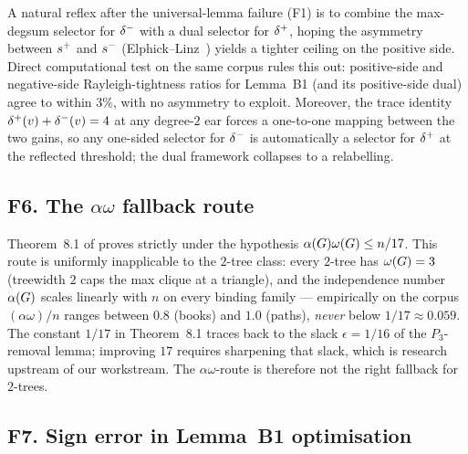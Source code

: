 A natural reflex after the universal-lemma failure (F1) is to combine
the max-degsum selector for $\delta^{-}$ with a dual selector for $\delta^{+}$,
hoping the asymmetry between $s^{+}$ and $s^{-}$
(Elphick--Linz~\cite{ElphickLinz2023}) yields a tighter ceiling on the
positive side. Direct computational test on the same corpus rules this
out: positive-side and negative-side Rayleigh-tightness ratios for
Lemma~B1 (and its positive-side dual) agree to within $3\%$, with no
asymmetry to exploit. Moreover, the trace identity
$\delta^{+}(v) + \delta^{-}(v) = 4$ at any degree-$2$ ear forces a one-to-one
mapping between the two gains, so any one-sided selector for $\delta^{-}$
is automatically a selector for $\delta^{+}$ at the reflected threshold;
the dual framework collapses to a relabelling.

\subsection{F6. The $\alpha\omega$ fallback route}\label{sec:fm:alpha-omega}

Theorem~8.1 of \cite{AKMPZ2025} proves  strictly under
the hypothesis $\alpha(G) \omega(G) \le n/17$. This route is
uniformly inapplicable to the $2$-tree class: every $2$-tree has
$\omega(G) = 3$ (treewidth $2$ caps the max clique at a triangle),
and the independence number $\alpha(G)$ scales linearly with $n$
on every binding family — empirically on the corpus
$(\alpha \omega)/n$ ranges between $0.8$ (books) and $1.0$ (paths),
\emph{never} below $1/17 \approx 0.059$. The constant $1/17$ in
Theorem~8.1 traces back to the slack $\epsilon = 1/16$ of the
$P_{3}$-removal lemma; improving $17$ requires sharpening that slack,
which is research upstream of our workstream. The $\alpha\omega$-route
is therefore not the right fallback for $2$-trees.

\subsection{F7. Sign error in Lemma~B1 optimisation}\label{sec:fm:sign-error}

